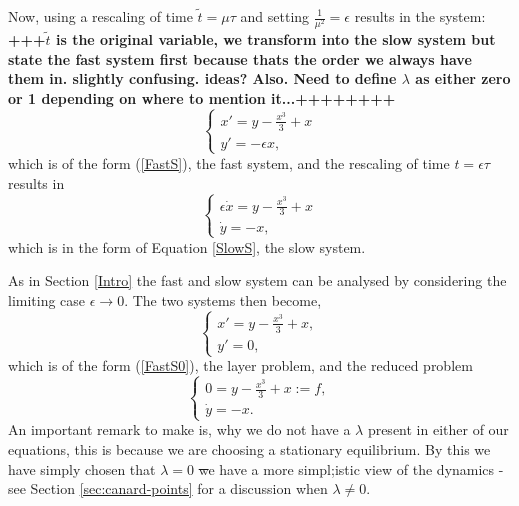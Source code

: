 Now, using a rescaling of time $ \tilde{t} = \mu \tau$ and setting $ \frac{1}{\mu^2} = \epsilon$ results in the system: \\
\textbf{+++$ \tilde{t}$ is the original variable, we transform into the slow system but state the fast system first because thats the order we always have them in. slightly confusing. ideas? Also. Need to define $\lambda$ as either zero or 1 depending on where to mention it...++++++++}
\begin{equation}\label{fastsystem}
\begin{cases} x'=y-\frac{x^3}{3}+x\\
y'=-\epsilon x,
\end{cases}
\end{equation}
which is of the form (\ref{FastS}), the fast system, and the rescaling of time $t= \epsilon \tau$ results in 
\begin{equation}\label{slowsystem}
\begin{cases} \epsilon \dot{x}=y-\frac{x^3}{3}+x\\
\dot{y}=-x,
\end{cases}
\end{equation}
which is in the form of Equation \ref{SlowS}, the slow system. 

As in Section \ref{Intro} the fast and slow system can be analysed by considering the limiting case $\epsilon \to 0$. The two systems then become,
\begin{equation}\label{fastsystem0}
\begin{cases} x'=y-\frac{x^3}{3}+x,\\
y'=0,
\end{cases}
\end{equation}
which is of the form (\ref{FastS0}), the layer problem, and the reduced problem 
\begin{equation}\label{slowsystem0}
\begin{cases} 0=y-\frac{x^3}{3}+x:=f,\\
\dot{y}=-x.
\end{cases}
\end{equation}
An important remark to make is, why we do not have a $ \lambda $ present in either of our equations, this is because we are choosing a stationary equilibrium. By this we have simply chosen that $ \lambda=0 $ \st we have a more simpl;istic view of the dynamics - see Section \ref{sec:canard-points} for a discussion when $ \lambda\neq0. $

